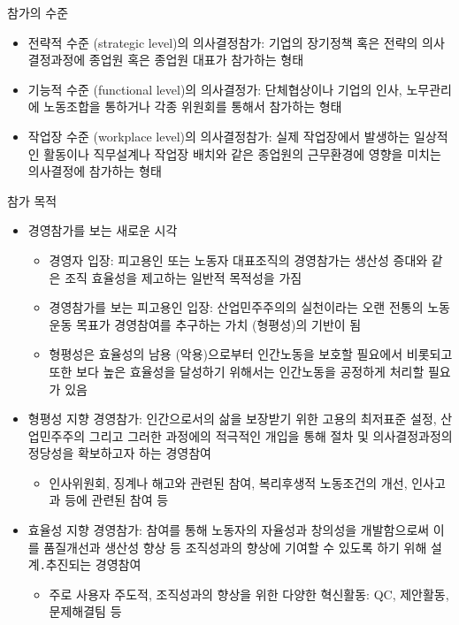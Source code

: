 \documentclass[aspectratio=169,xcolor=dvipsnames,handout]{beamer}
\begin{document}
\begin{frame}{참가의 수준}
    \begin{itemize}[<+->]
        \item 전략적 수준 (strategic level)의 의사결정참가: 기업의 장기정책 혹은 전략의 의사결정과정에 종업원 혹은 종업원 대표가 참가하는 형태
        \item 기능적 수준 (functional level)의 의사결정가: 단체협상이나 기업의 인사, 노무관리에 노동조합을 통하거나 각종 위원회를 통해서 참가하는 형태
        \item 작업장 수준 (workplace level)의 의사결정참가: 실제 작업장에서 발생하는 일상적인 활동이나 직무설계나 작업장 배치와 같은 종업원의 근무환경에 영향을 미치는 의사결정에 참가하는 형태
    \end{itemize}
\end{frame}

\begin{frame}[allowframebreaks]{참가 목적}
    \begin{itemize}[<+->]
        \item 경영참가를 보는 새로운 시각
        \begin{itemize}[<+->]
            \item 경영자 입장: 피고용인 또는 노동자 대표조직의 경영참가는 생산성 증대와 같은 조직 효율성을 제고하는 일반적 목적성을 가짐
            \item 경영참가를 보는 피고용인 입장: 산업민주주의의 실천이라는 오랜 전통의 노동운동 목표가 경영참여를 추구하는 가치 (형평성)의 기반이 됨
            \item 형평성은 효율성의 남용 (악용)으로부터 인간노동을 보호할 필요에서 비롯되고 또한 보다 높은 효율성을 달성하기 위해서는 인간노동을 공정하게 처리할 필요가 있음
        \end{itemize}
        \framebreak\relax
        \item 형평성 지향 경영참가: 인간으로서의 삶을 보장받기 위한 고용의 최저표준 설정, 산업민주주의 그리고 그러한 과정에의 적극적인 개입을 통해 절차 및 의사결정과정의 정당성을 확보하고자 하는 경영참여
        \begin{itemize}[<+->]
            \item 인사위원회, 징계나 해고와 관련된 참여, 복리후생적 노동조건의 개선, 인사고과 등에 관련된 참여 등
        \end{itemize}
        \item 효율성 지향 경영참가: 참여를 통해 노동자의 자율성과 창의성을 개발함으로써 이를 품질개선과 생산성 향상 등 조직성과의 향상에 기여할 수 있도록 하기 위해 설계․추진되는 경영참여
        \begin{itemize}[<+->]
            \item 주로 사용자 주도적, 조직성과의 향상을 위한 다양한 혁신활동: QC, 제안활동, 문제해결팀 등
        \end{itemize}
    \end{itemize}
\end{frame}

\end{document}
